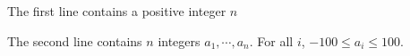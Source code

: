 The first line contains a positive integer $n$

The second line contains $n$ integers $a_1, \cdots, a_n$. For all $i$, $-100 \leq a_i \leq 100$.